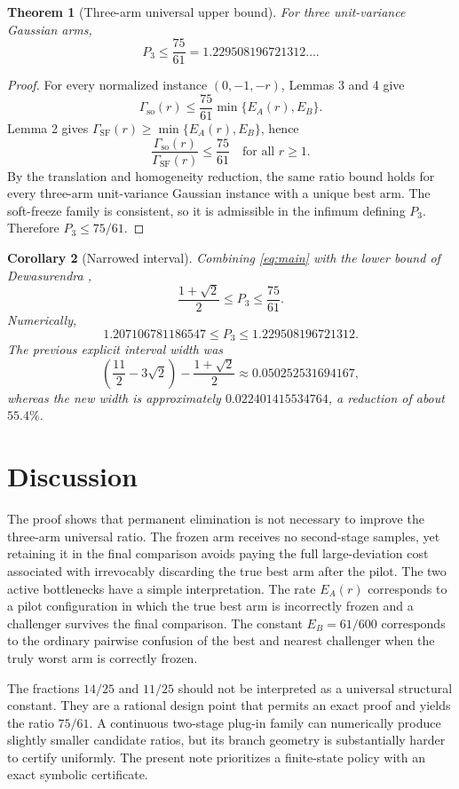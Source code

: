 \documentclass[11pt]{article}
\newtheorem{theorem}{Theorem}
\newtheorem{corollary}[theorem]{Corollary}
\theoremstyle{definition}
\theoremstyle{remark}
\newcommand{\SF}{\mathrm{SF}}
\newcommand{\so}{\mathrm{so}}
\begin{document}
\begin{theorem}[Three-arm universal upper bound]
For three unit-variance Gaussian arms,
\begin{equation}
\boxed{P_3\le\frac{75}{61}=1.229508196721312\ldots}.
\label{eq:main}
\end{equation}
\end{theorem}
\begin{proof}
For every normalized instance $(0,-1,-r)$, Lemmas 3 and 4 give
\[
\Gamma_{\so}(r)
\le
\frac{75}{61}\min\{E_A(r),E_B\}.
\]
Lemma 2 gives $\Gamma_{\SF}(r)\ge\min\{E_A(r),E_B\}$, hence
\[
\frac{\Gamma_{\so}(r)}{\Gamma_{\SF}(r)}\le\frac{75}{61}
\quad\text{for all }r\ge1.
\]
By the translation and homogeneity reduction, the same ratio bound holds for every three-arm unit-variance Gaussian instance with a unique best arm. The soft-freeze family is consistent, so it is admissible in the infimum defining $P_3$. Therefore $P_3\le75/61$.
\end{proof}

\begin{corollary}[Narrowed interval]
Combining \eqref{eq:main} with the lower bound of Dewasurendra \cite{dewasurendra2026},
\[
\boxed{
\frac{1+\sqrt2}{2}
\le P_3\le
\frac{75}{61}
}.
\]
Numerically,
\[
1.207106781186547\le P_3\le1.229508196721312.
\]
The previous explicit interval width was
\[
\left(\frac{11}{2}-3\sqrt2\right)-\frac{1+\sqrt2}{2}
\approx0.050252531694167,
\]
whereas the new width is approximately $0.022401415534764$, a reduction of about $55.4\%$.
\end{corollary}

\section{Discussion}

The proof shows that permanent elimination is not necessary to improve the three-arm universal ratio. The frozen arm receives no second-stage samples, yet retaining it in the final comparison avoids paying the full large-deviation cost associated with irrevocably discarding the true best arm after the pilot. The two active bottlenecks have a simple interpretation. The rate $E_A(r)$ corresponds to a pilot configuration in which the true best arm is incorrectly frozen and a challenger survives the final comparison. The constant $E_B=61/600$ corresponds to the ordinary pairwise confusion of the best and nearest challenger when the truly worst arm is correctly frozen.

The fractions $14/25$ and $11/25$ should not be interpreted as a universal structural constant. They are a rational design point that permits an exact proof and yields the ratio $75/61$. A continuous two-stage plug-in family can numerically produce slightly smaller candidate ratios, but its branch geometry is substantially harder to certify uniformly. The present note prioritizes a finite-state policy with an exact symbolic certificate.
\end{document}
